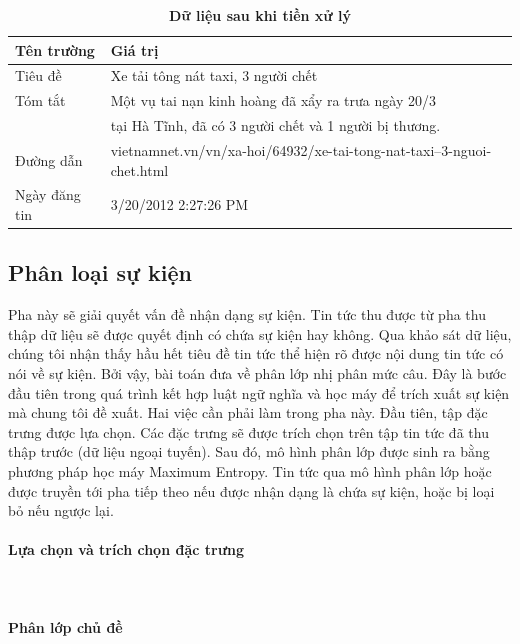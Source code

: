 \begin{table}
	\centering
\caption{\textbf{Dữ liệu sau khi tiền xử lý} }
  \begin{tabular}{|l|l|}
     \hline
     \textbf{Tên trường} & \textbf{Giá trị} \\
     \hline
     Tiêu đề & Xe tải tông nát taxi, 3 người chết \\
     \hline
     Tóm tắt & Một vụ tai nạn kinh hoàng đã xẩy ra trưa ngày 20/3 \\
     $\;$ $\;$ $\;$ $\;$ $\;$ $\;$ $\;$ $\;$ &	tại Hà Tĩnh, đã có 3 người chết và 1 người bị thương. \\
     \hline
     Đường dẫn & vietnamnet.vn/vn/xa-hoi/64932/xe-tai-tong-nat-taxi--3-nguoi-chet.html \\
     \hline
     Ngày đăng tin & 3/20/2012 2:27:26 PM \\
     \hline
  \end{tabular}

  \label{tb:rawdata}
\end{table}



\subsection{Phân loại sự kiện}
\label{classifi}

\noindent Pha này sẽ giải quyết vấn đề nhận dạng sự kiện. Tin tức thu được từ pha  thu thập dữ liệu sẽ được quyết định có chứa sự kiện hay không. Qua khảo sát dữ liệu, chúng tôi nhận thấy hầu hết tiêu đề tin tức thể hiện rõ được nội dung tin tức có nói về sự kiện. Bởi vậy, bài toán đưa về phân lớp nhị phân mức câu. Đây là bước đầu tiên trong quá trình kết hợp luật ngữ nghĩa và học máy để trích xuất sự kiện mà chung tôi đề xuất. Hai việc cần phải làm trong pha này. Đầu tiên, tập đặc trưng được lựa chọn. Các đặc trưng sẽ được trích chọn trên tập tin tức đã thu thập trước (dữ liệu ngoại tuyến). Sau đó, mô hình phân lớp được sinh ra bằng  phương pháp học máy Maximum Entropy. Tin tức qua mô hình phân lớp hoặc được truyền tới pha tiếp theo nếu được nhận dạng là chứa sự kiện, hoặc bị loại bỏ nếu ngược lại.

\paragraph{Lựa chọn và trích chọn đặc trưng}  $\;$ \\


\paragraph{Phân lớp chủ đề} $\;$ \\



